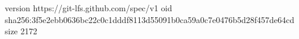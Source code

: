 version https://git-lfs.github.com/spec/v1
oid sha256:3f5e2ebb0636bc22c0c1dddf8113d55091b0ca59a0c7e0476b5d28f457de64cd
size 2172
